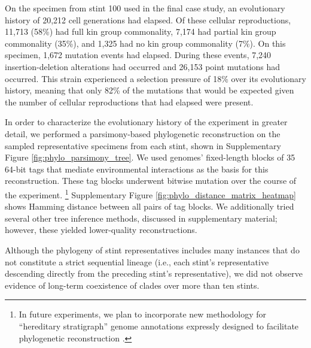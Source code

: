 On the specimen from stint 100 used in the final case study, an evolutionary history of 20,212 cell generations had elapsed.
Of these cellular reproductions, 11,713 (58\%) had full kin group commonality, 7,174 had partial kin group commonality (35\%), and 1,325 had no kin group commonality (7\%).
On this specimen, 1,672 mutation events had elapsed.
During these events, 7,240 insertion-deletion alterations had occurred and 26,153 point mutations had occurred.
This strain experienced a selection pressure of 18\% over its evolutionary history, meaning that only 82\% of the mutations that would be expected given the number of cellular reproductions that had elapsed were present.

In order to characterize the evolutionary history of the experiment in greater detail, we performed a parsimony-based phylogenetic reconstruction on the sampled representative specimens from each stint, shown in Supplementary Figure \ref{fig:phylo_parsimony_tree}.
We used genomes' fixed-length blocks of 35 64-bit tags that mediate environmental interactions as the basis for this reconstruction.
These tag blocks underwent bitwise mutation over the course of the experiment.%
\footnote{
In future experiments, we plan to incorporate new methodology for ``hereditary stratigraph'' genome annotations expressly designed to facilitate phylogenetic reconstruction .
}
Supplementary Figure \ref{fig:phylo_distance_matrix_heatmap} shows Hamming distance between all pairs of tag blocks.
We additionally tried several other tree inference methods, discussed in supplementary material; however, these yielded lower-quality reconstructions.

Although the phylogeny of stint representatives includes many instances that do not constitute a strict sequential lineage (i.e., each stint's representative descending directly from the preceding stint's representative), we did not observe evidence of long-term coexistence of clades over more than ten stints.


